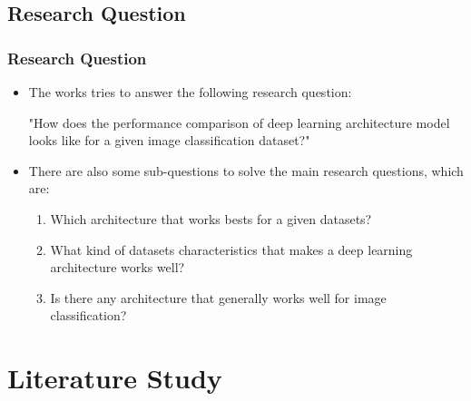 \documentclass{beamer}
\begin{document}
\subsection{Research Question}
\begin{frame}\frametitle{Research Question}    
\begin{itemize}
\item The works tries to answer the following research question: 

"How does the performance comparison of deep learning architecture model looks like for a given image classification dataset?" 

\item There are also some sub-questions to solve the main research questions, which are:
\begin{enumerate}
\item Which architecture that works bests for a given datasets?
\item What kind of datasets characteristics that makes a deep learning architecture works well?
\item Is there any architecture that generally works well for image classification?
\end{enumerate}
\end{itemize}
\end{frame}


\section{Literature Study} 
\end{document}
